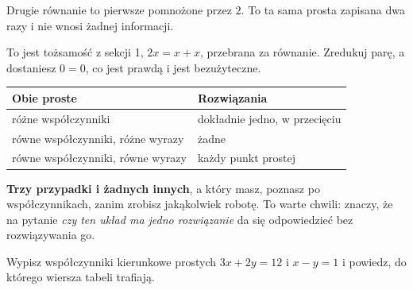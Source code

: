 \begin{fr}
Drugie równanie to pierwsze pomnożone przez $2$. To ta sama prosta zapisana
dwa razy i nie wnosi żadnej informacji.

To jest tożsamość z sekcji 1, $2x = x + x$, przebrana za równanie. Zredukuj
parę, a dostaniesz $0 = 0$, co jest prawdą i jest bezużyteczne.

\begin{center}
\begin{tabular}{ll}
\toprule
Obie proste & Rozwiązania \\
\midrule
różne współczynniki & dokładnie jedno, w przecięciu \\
równe współczynniki, różne wyrazy & żadne \\
równe współczynniki, równe wyrazy & każdy punkt prostej \\
\bottomrule
\end{tabular}
\end{center}

\textbf{Trzy przypadki i żadnych innych}, a który masz, poznasz po
współczynnikach, zanim zrobisz jakąkolwiek robotę. To warte chwili: znaczy, że
na pytanie \emph{czy ten układ ma jedno rozwiązanie} da się odpowiedzieć bez
rozwiązywania go.

Wypisz współczynniki kierunkowe prostych $3x + 2y = 12$ i $x - y = 1$ i
powiedz, do którego wiersza tabeli trafiają.
\nextframe
\end{fr}

